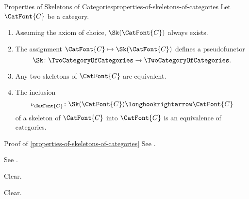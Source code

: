 \begin{proposition}{Properties of Skeletons of Categories}{properties-of-skeletons-of-categories}%
    Let $\CatFont{C}$ be a category.
    \begin{enumerate}
        \item\label{properties-of-skeletons-of-categories-existence}Assuming the axiom of choice, $\Sk(\CatFont{C})$ always exists.
        \item\label{properties-of-skeletons-of-categories-pseudofunctoriality}The assignment $\CatFont{C}\mapsto\Sk(\CatFont{C})$ defines a pseudofunctor
            \[%
                \Sk%
                \colon%
                \TwoCategoryOfCategories%
                \to%
                \TwoCategoryOfCategories.%
            \]%
        \item\label{properties-of-skeletons-of-categories-uniqueness-up-to-equivalence}Any two skeletons of $\CatFont{C}$ are equivalent.
        \item\label{properties-of-skeletons-of-categories-inclusions-of-skeletons-are-equivalences}The inclusion
            \[
                \iota_{\CatFont{C}}%
                \colon%
                \Sk(\CatFont{C})%
                \longhookrightarrow%
                \CatFont{C}
            \]%
            of a skeleton of $\CatFont{C}$ into $\CatFont{C}$ is an equivalence of categories.
    \end{enumerate}
\end{proposition}
\begin{Proof}{Proof of \cref{properties-of-skeletons-of-categories}}%
    See \cite[Section ]{nlab:skeleton}.

    See \cite[Section ]{nlab:skeleton}.

    Clear.

    Clear.
\end{Proof}
